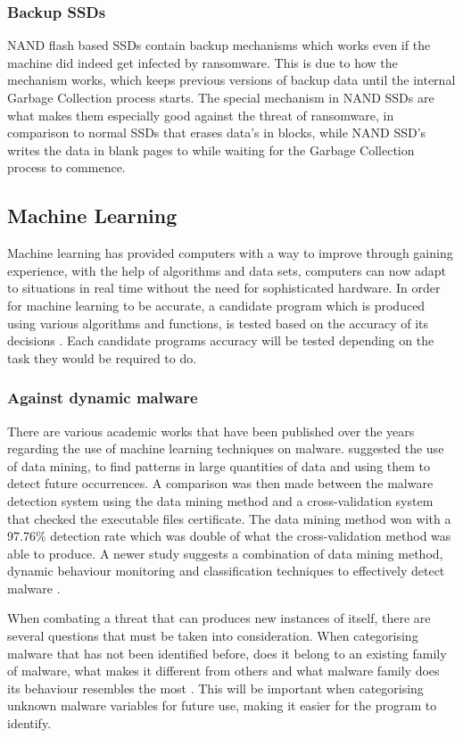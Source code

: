 \documentclass[progress]{cmpreport}
\begin{document}
			\subsubsection{Backup SSDs}
			NAND flash based SSDs contain backup mechanisms which works even if the machine did indeed get infected by ransomware. This is due to how the mechanism works, which keeps previous versions of backup data until the internal Garbage Collection process starts\citep{8550727}. The special mechanism in NAND SSDs are what makes them especially good against the threat of ransomware, in comparison to normal SSDs that erases data's in blocks, while NAND SSD's writes the data in blank pages to while waiting for the Garbage Collection process to commence. 		
			
		\subsection{Machine Learning}
			Machine learning has provided computers with a way to improve through gaining experience, with the help of algorithms and data sets, computers can now adapt to situations in real time without the need for sophisticated hardware. In order for machine learning to be accurate, a candidate program which is produced using various algorithms and functions, is tested based on the accuracy of its decisions \citep{doi:10.1126/science.aaa8415}. Each candidate programs accuracy will be tested depending on the task they would be required to do.
			
			\subsubsection{Against dynamic malware}
			There are various academic works that have been published over the years regarding the use of machine learning techniques on malware. \cite{924286} suggested the use of data mining, to find patterns in large quantities of data and using them to detect future occurrences. A comparison was then made between the malware detection system using the data mining method and a cross-validation system that checked the executable files certificate. The data mining method won with a 97.76\% detection rate which was double of what the cross-validation method was able to produce. A newer study suggests a combination of data mining method, dynamic behaviour monitoring and classification techniques to effectively detect malware \citep{5675808}. 
			
			When combating a threat that can produces new instances of itself, there are several questions that must be taken into consideration. When categorising malware that has not been identified before, does it belong to an existing family of malware, what makes it different from others and what malware family does its behaviour resembles the most \citep{10.1007/978-3-540-70542-0_6}. This will be important when categorising unknown malware variables for future use, making it easier for the program to identify. 
			
\end{document}

